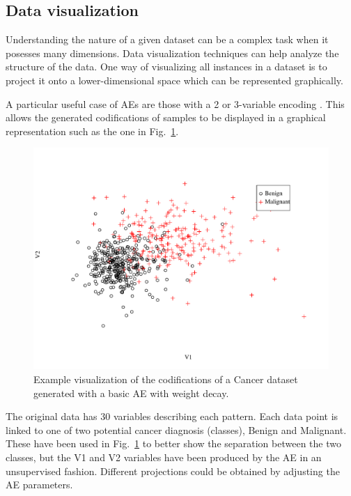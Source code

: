 \subsection{Data visualization}\label{Sec.Visualization}

Understanding the nature of a given dataset can be a complex task when it posesses many dimensions. Data visualization techniques \cite{InfoVis} can help analyze the structure of the data. One way of visualizing all instances in a dataset is to project it onto a lower-dimensional space which can be represented graphically.

A particular useful case of AEs are those with a 2 or 3-variable encoding \cite{hinton_reducing_2006}. This allows the generated codifications of samples to be displayed in a graphical representation such as the one in Fig.~\ref{Fig.Cancer}.

\begin{figure}[h!]
  \centering
  \includegraphics[width=.95\figwidth]{cancer_2var.pdf}
  \caption{\label{Fig.Cancer}Example visualization of the codifications of a Cancer dataset generated with a basic AE with weight decay.}
\end{figure}

The original data \cite{WDBC} has 30 variables describing each pattern. Each data point is linked to one of two potential cancer diagnosis (classes), Benign and Malignant. These have been used in Fig.~\ref{Fig.Cancer} to better show the separation between the two classes, but the V1 and V2 variables have been produced by the AE in an unsupervised fashion. Different projections could be obtained by adjusting the AE parameters.

